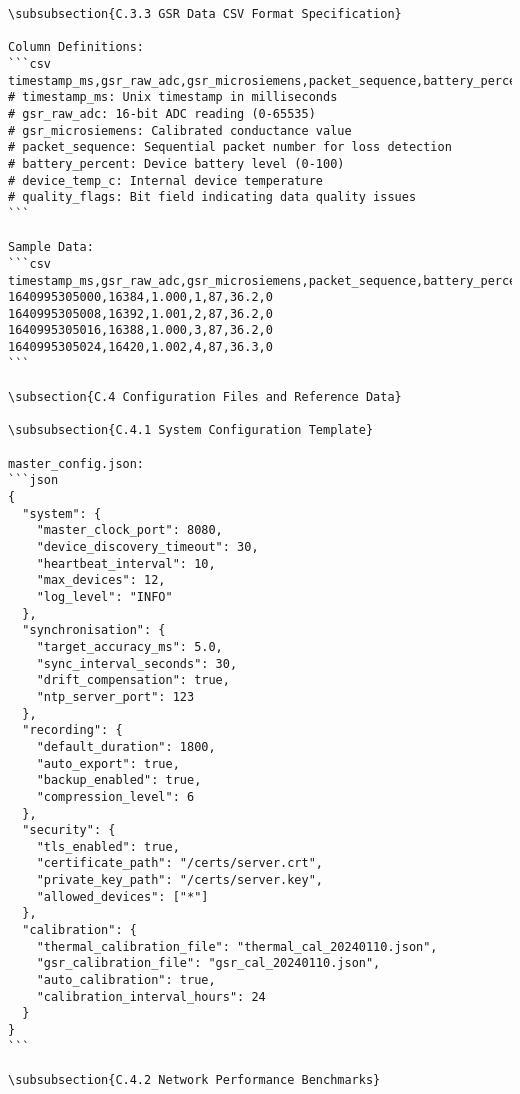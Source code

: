\begin{verbatim}
\subsubsection{C.3.3 GSR Data CSV Format Specification}

Column Definitions:
```csv
timestamp_ms,gsr_raw_adc,gsr_microsiemens,packet_sequence,battery_percent,device_temp_c,quality_flags
# timestamp_ms: Unix timestamp in milliseconds
# gsr_raw_adc: 16-bit ADC reading (0-65535)
# gsr_microsiemens: Calibrated conductance value
# packet_sequence: Sequential packet number for loss detection
# battery_percent: Device battery level (0-100)
# device_temp_c: Internal device temperature
# quality_flags: Bit field indicating data quality issues
```

Sample Data:
```csv
timestamp_ms,gsr_raw_adc,gsr_microsiemens,packet_sequence,battery_percent,device_temp_c,quality_flags
1640995305000,16384,1.000,1,87,36.2,0
1640995305008,16392,1.001,2,87,36.2,0
1640995305016,16388,1.000,3,87,36.2,0
1640995305024,16420,1.002,4,87,36.3,0
```

\subsection{C.4 Configuration Files and Reference Data}

\subsubsection{C.4.1 System Configuration Template}

master_config.json:
```json
{
  "system": {
    "master_clock_port": 8080,
    "device_discovery_timeout": 30,
    "heartbeat_interval": 10,
    "max_devices": 12,
    "log_level": "INFO"
  },
  "synchronisation": {
    "target_accuracy_ms": 5.0,
    "sync_interval_seconds": 30,
    "drift_compensation": true,
    "ntp_server_port": 123
  },
  "recording": {
    "default_duration": 1800,
    "auto_export": true,
    "backup_enabled": true,
    "compression_level": 6
  },
  "security": {
    "tls_enabled": true,
    "certificate_path": "/certs/server.crt",
    "private_key_path": "/certs/server.key",
    "allowed_devices": ["*"]
  },
  "calibration": {
    "thermal_calibration_file": "thermal_cal_20240110.json",
    "gsr_calibration_file": "gsr_cal_20240110.json",
    "auto_calibration": true,
    "calibration_interval_hours": 24
  }
}
```

\subsubsection{C.4.2 Network Performance Benchmarks}


\end{verbatim}
